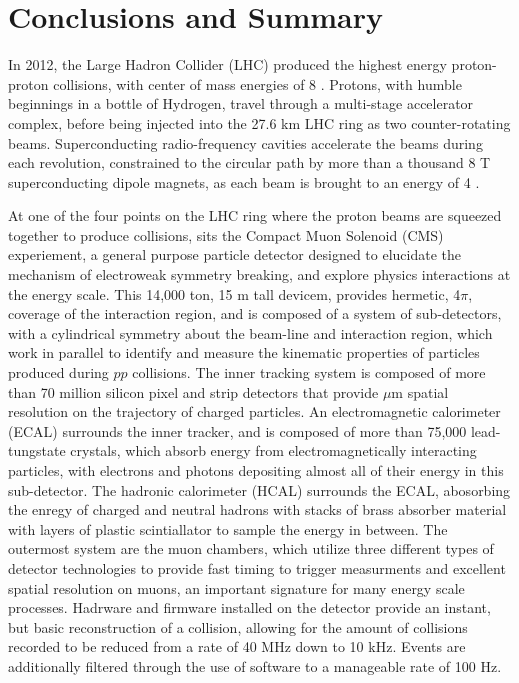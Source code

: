 \chapter{Conclusions and Summary}
\label{summary_overview}

\par In 2012, the Large Hadron Collider (LHC) produced the highest
energy proton-proton collisions, with center of mass energies of 8
\TeV.  Protons, with humble beginnings in a bottle of Hydrogen, travel
through a multi-stage accelerator complex, before being injected into
the 27.6 km LHC ring as two counter-rotating beams.  Superconducting
radio-frequency cavities accelerate the beams during each revolution,
constrained to the circular path by more than a thousand 8 T
superconducting dipole magnets, as each beam is brought to an energy
of 4 \TeV.  

\par At one of the four points on the LHC ring where the proton beams
are squeezed together to produce collisions, sits the Compact Muon
Solenoid (CMS) experiement, a general purpose particle detector
designed to elucidate the mechanism of electroweak symmetry breaking,
and explore physics interactions at the \TeV energy scale.  This
14,000 ton, 15 m tall devicem, provides hermetic, 4$\pi$, coverage of
the interaction region, and is composed of a system of sub-detectors,
with a cylindrical symmetry about the beam-line and interaction
region, which work in parallel to identify and measure the kinematic
properties of particles produced during $pp$ collisions.  The inner
tracking system is composed of more than 70 million silicon pixel and
strip detectors that provide $\mu$m spatial resolution on the
trajectory of charged particles.  An electromagnetic calorimeter
(ECAL) surrounds the inner tracker, and is composed of more than
75,000 lead-tungstate crystals, which absorb energy from
electromagnetically interacting particles, with electrons and photons
depositing almost all of their energy in this sub-detector.  The
hadronic calorimeter (HCAL) surrounds the ECAL, abosorbing the enregy
of charged and neutral hadrons with stacks of brass absorber material
with layers of plastic scintiallator to sample the energy in between.
The outermost system are the muon chambers, which utilize three
different types of detector technologies to provide fast timing to
trigger measurments and excellent spatial resolution on muons, an
important signature for many \TeV energy scale processes.  Hadrware
and firmware installed on the detector provide an instant, but basic
reconstruction of a collision, allowing for the amount of collisions
recorded to be reduced from a rate of 40 MHz down to 10 kHz.  Events
are additionally filtered through the use of software to a manageable
rate of 100 Hz.  

